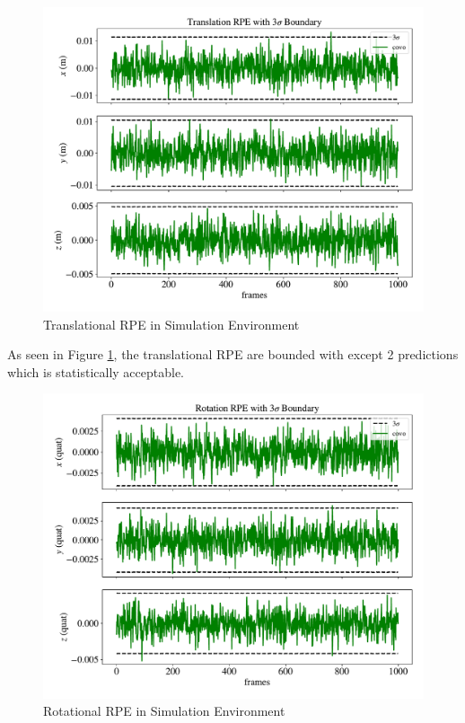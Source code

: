 \documentclass[a4paper]{report}
\numberwithin{figure}{section}
\begin{document}
\begin{figure}[H]
  \centering
  \includegraphics[width=0.8\linewidth,natwidth=640,natheight=640]
  {fig/eva_graphs/synt_trans_rpe_3sigma.pdf}
  \caption{Translational RPE in Simulation Environment}
  \label{fig:synt_trans_rpe_3sigma}
\end{figure}

As seen in Figure \ref{fig:synt_trans_rpe_3sigma}, the translational RPE 
are bounded with except 2 predictions which is statistically 
acceptable. 

\begin{figure}[H]
  \centering
  \includegraphics[width=0.8\linewidth,natwidth=640,natheight=640]
  {fig/eva_graphs/synt_rot_rpe_3sigma.pdf}
  \caption{Rotational RPE in Simulation Environment}
	\label{fig:synt_rot_rpe_3sigma}
\end{figure}
\end{document}
